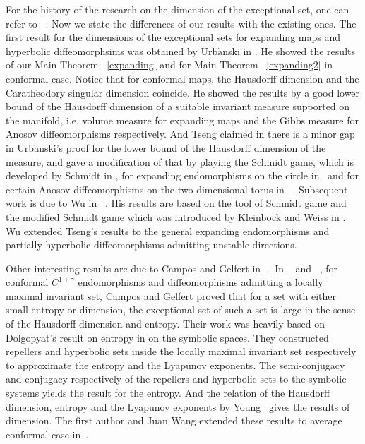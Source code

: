\documentclass[11pt,a4paper]{amsart}
\theoremstyle{plain}
\theoremstyle{remark}
\begin{document}
	For the history of the research on the dimension of the exceptional set, one can refer to ~\cite{CG1, CG2}. Now we state the differences of our results with the existing ones. The first result for the dimensions of the exceptional sets for expanding maps and hyperbolic diffeomorphsims was obtained by  Urb$\acute{\text{a}}$nski in \cite{Urbanski}. He showed the results of our Main Theorem ~\ref{expanding}  and for Main Theorem ~\ref{expanding2} in conformal case. Notice that for conformal maps, the Hausdorff dimension and the Carath$\acute{\text{e}}$odory singular dimension coincide. He showed the results by a good lower bound of the Hausdorff dimension of a suitable invariant measure supported on the manifold, i.e. volume measure for expanding maps and the Gibbs measure for Anosov diffeomorphisms respectively. And Tseng claimed in \cite{Tseng1} there is a minor gap in Urb$\acute{\text{a}}$nski's proof for the lower bound of the Hausdorff dimension of the measure, and gave a modification of that by playing the Schmidt game, which is developed by Schmidt in \cite{Schmidt}, for expanding endomorphisms on the circle in~\cite{Tseng1} and for certain Anosov diffeomorphisms on the two dimensional torus in ~\cite{Tseng2}. Subsequent work is due to Wu in ~\cite{Wu1, Wu2, Wu3}. His results are based on the tool of Schmidt game and the modified Schmidt game which was introduced by Kleinbock and Weiss in \cite{KW}. Wu extended Tseng's results to the general expanding endomorphisms and partially hyperbolic diffeomorphisms admitting unstable directions.
	
	
	
	Other interesting results are due to Campos and Gelfert in ~\cite{CG1,CG2}. In ~\cite{CG1} and ~\cite{CG2}, for conformal $C^{1+\gamma}$ endomorphisms and diffeomorphisms admitting a locally maximal invariant set, Campos and Gelfert proved that for a set with either small entropy or dimension, the exceptional set of such a set is large in the sense of the Hausdorff dimension and entropy. Their work was heavily based on Dolgopyat's result on entropy in \cite{Do} on the symbolic spaces. They constructed repellers and hyperbolic sets inside the locally maximal invariant set respectively to approximate the entropy and the Lyapunov exponents. The semi-conjugacy and conjugacy respectively of the repellers and hyperbolic sets to the symbolic systems yields the result for the entropy. And the relation of the Hausdorff dimension, entropy and the Lyapunov exponents by Young~\cite{Young} gives the results of dimension. The first author and Juan Wang extended these results to average conformal case in~\cite{QW}.
	
\end{document}
